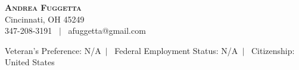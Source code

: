 \documentclass[letterpaper,12pt]{fed-res} %
\begin{document}
\begin{center}
    \textbf{\Huge \scshape Andrea Fuggetta} \\ \vspace{1pt}
    Cincinnati, OH 45249 \\ \vspace{1pt}
     347-208-3191 \ $|$ \ afuggetta@gmail.com \\ \vspace{1pt} %
\end{center}

Veteran's Preference: N/A\ $|$ \ Federal Employment Status: N/A\ $|$ \ Citizenship: United States %










% 
\end{document}
